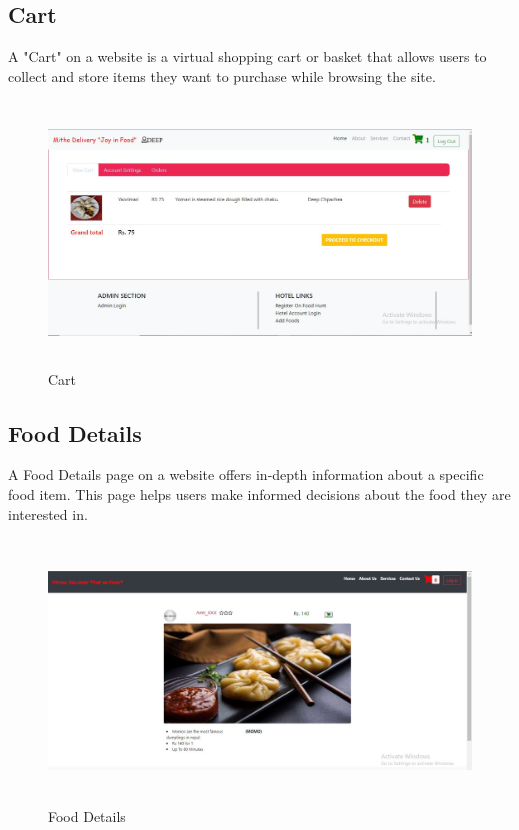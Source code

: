 \subsection{Cart}
A "Cart" on a website is a virtual shopping cart or basket that allows users to collect and store items they want to purchase while browsing the site. 
\begin{figure}[h]
    \centering
    \includegraphics[height=7cm]{img/Graphics/cart ui.JPG}
    \caption{Cart}
\end{figure}

\subsection{Food Details}
A Food Details page on a website offers in-depth information about a specific food item. This page helps users make informed decisions about the food they are interested in.
\begin{figure}[h]
    \centering
    \includegraphics[height=7cm]{img/Graphics/food detail ui.JPG}
    \caption{Food Details}
\end{figure}

\newpage
